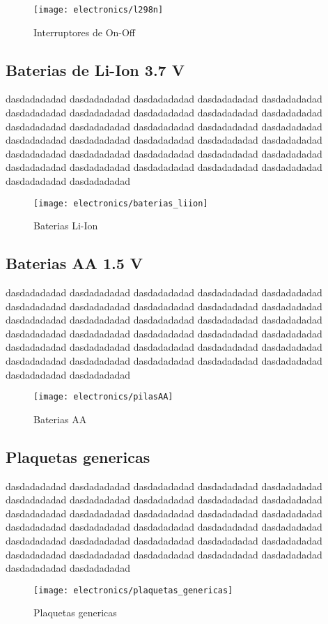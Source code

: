 \begin{figure}[h]
    \centering
    \texttt{[image: electronics/l298n]}
    \caption{Interruptores de On-Off}
    \label{fig:l298n}
\end{figure}

\subsection{Baterias de Li-Ion 3.7 V}
dasdadadadad dasdadadadad dasdadadadad dasdadadadad dasdadadadad dasdadadadad dasdadadadad dasdadadadad dasdadadadad dasdadadadad dasdadadadad dasdadadadad dasdadadadad dasdadadadad dasdadadadad dasdadadadad dasdadadadad dasdadadadad dasdadadadad dasdadadadad dasdadadadad dasdadadadad dasdadadadad dasdadadadad dasdadadadad dasdadadadad dasdadadadad dasdadadadad dasdadadadad dasdadadadad dasdadadadad dasdadadadad

\begin{figure}[h]
    \centering
    \texttt{[image: electronics/baterias\_liion]}
    \caption{Baterias Li-Ion}
    \label{fig:baterias_liion}
\end{figure}

\subsection{Baterias AA 1.5 V}

dasdadadadad dasdadadadad dasdadadadad dasdadadadad dasdadadadad dasdadadadad dasdadadadad dasdadadadad dasdadadadad dasdadadadad dasdadadadad dasdadadadad dasdadadadad dasdadadadad dasdadadadad dasdadadadad dasdadadadad dasdadadadad dasdadadadad dasdadadadad dasdadadadad dasdadadadad dasdadadadad dasdadadadad dasdadadadad dasdadadadad dasdadadadad dasdadadadad dasdadadadad dasdadadadad dasdadadadad dasdadadadad
\begin{figure}[h]
    \centering
    \texttt{[image: electronics/pilasAA]}
    \caption{Baterias AA}
    \label{fig:pilasAA}
\end{figure}

\subsection{Plaquetas genericas}
dasdadadadad dasdadadadad dasdadadadad dasdadadadad dasdadadadad dasdadadadad dasdadadadad dasdadadadad dasdadadadad dasdadadadad dasdadadadad dasdadadadad dasdadadadad dasdadadadad dasdadadadad dasdadadadad dasdadadadad dasdadadadad dasdadadadad dasdadadadad dasdadadadad dasdadadadad dasdadadadad dasdadadadad dasdadadadad dasdadadadad dasdadadadad dasdadadadad dasdadadadad dasdadadadad dasdadadadad dasdadadadad
\begin{figure}[h]
    \centering
    \texttt{[image: electronics/plaquetas\_genericas]}
    \caption{Plaquetas genericas}
    \label{fig:plaquetas_genericas}
\end{figure}


